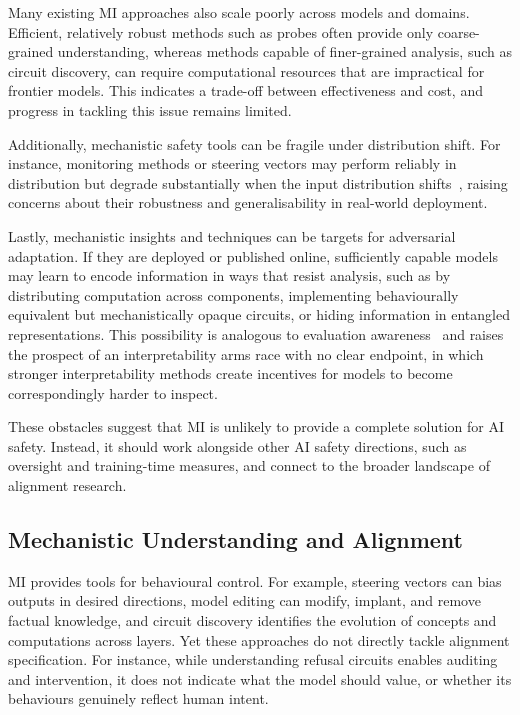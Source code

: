 Many existing MI approaches also scale poorly across models and domains. Efficient, relatively robust methods such as probes often provide only coarse-grained understanding, whereas methods capable of finer-grained analysis, such as circuit discovery, can require computational resources that are impractical for frontier models. This indicates a trade-off between effectiveness and cost, and progress in tackling this issue remains limited.

Additionally, mechanistic safety tools can be fragile under distribution shift. For instance, monitoring methods or steering vectors may perform reliably in distribution but degrade substantially when the input distribution shifts~, raising concerns about their robustness and generalisability in real-world deployment.

Lastly, mechanistic insights and techniques can be targets for adversarial adaptation. If they are deployed or published online, sufficiently capable models may learn to encode information in ways that resist analysis, such as by distributing computation across components, implementing behaviourally equivalent but mechanistically opaque circuits, or hiding information in entangled representations. This possibility is analogous to evaluation awareness~ and raises the prospect of an interpretability arms race with no clear endpoint, in which stronger interpretability methods create incentives for models to become correspondingly harder to inspect.

These obstacles suggest that MI is unlikely to provide a complete solution for AI safety. Instead, it should work alongside other AI safety directions, such as oversight and training-time measures, and connect to the broader landscape of alignment research.

\subsection{Mechanistic Understanding and Alignment}
\label{sec:mechanistic-alignment}

MI provides tools for behavioural control. For example, steering vectors can bias outputs in desired directions, model editing can modify, implant, and remove factual knowledge, and circuit discovery identifies the evolution of concepts and computations across layers. 
Yet these approaches do not directly tackle alignment specification. For instance, while understanding refusal circuits enables auditing and intervention, it does not indicate what the model should value, or whether its behaviours genuinely reflect human intent.

